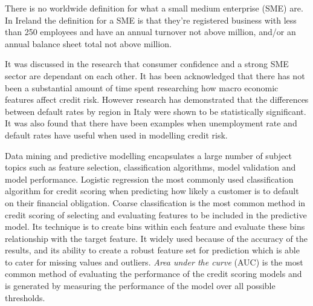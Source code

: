 There is no worldwide definition for what a small medium enterprise (SME) are. In Ireland the definition for a SME is that they're registered business with less than 250 employees and have an annual turnover not above  million, and/or an annual balance sheet total not above  million.

It was discussed in the research that consumer confidence and a strong SME sector are dependant on each other. It has been acknowledged that there has not been a substantial amount of time spent researching how macro economic features affect credit risk. However research has demonstrated that the differences between default rates by region in Italy were shown to be statistically significant. It was also found that there have been examples when unemployment rate and default rates have useful when used in modelling credit risk.

Data mining and predictive modelling encapsulates a large number of subject topics such as feature selection, classification algorithms, model validation and model performance. Logistic regression the most commonly used classification algorithm for credit scoring when predicting how likely a customer is to default on their financial obligation. Coarse classification is the most common method in credit scoring of selecting and evaluating features to be included in the predictive model. Its technique is to create bins within each feature and evaluate these bins relationship with the target feature. It widely used because of the accuracy of the results, and its ability to create a robust feature set for prediction which is able to cater for missing values and outliers. \textit{Area under the curve} (AUC) is the most common method of evaluating the performance of the credit scoring models and is generated by measuring the performance of the model over all possible thresholds.

